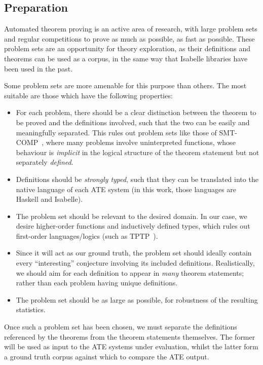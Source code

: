 \subsection{Preparation}
\label{section:prep}

Automated theorem proving is an active area of research, with large problem sets
and regular competitions to prove as much as possible, as fast as
possible\cite{pelletier2002development}. These problem sets are an opportunity
for theory exploration, as their definitions and theorems can be used as a
corpus, in the same way that Isabelle libraries have been used in the past.

Some problem sets are more amenable for this purpose than others. The most
suitable are those which have the following properties:

\begin{itemize}
\item For each problem, there should be a clear distinction between the theorem
  to be proved and the definitions involved, such that the two can be easily and
  meaningfully separated. This rules out problem sets like those of
  SMT-COMP~\cite{barrett2005smt}, where many problems involve uninterpreted
  functions, whose behaviour is \emph{implicit} in the logical structure of the
  theorem statement but not separately \emph{defined}.
\item Definitions should be \emph{strongly typed}, such that they can be
  translated into the native language of each ATE system (in this work, those
  languages are Haskell and Isabelle).
\item The problem set should be relevant to the desired domain. In our case, we
  desire higher-order functions and inductively defined types, which rules out
  first-order languages/logics (such as TPTP~\cite{sutcliffe2009tptp}).
\item Since it will act as our ground truth, the problem set should ideally
  contain every ``interesting'' conjecture involving its included
  definitions. Realistically, we should aim for each definition to appear in
  \emph{many} theorem statements; rather than each problem having unique
  definitions.
\item The problem set should be as large as possible, for robustness of the
  resulting statistics.
\end{itemize}

Once such a problem set has been chosen, we must separate the definitions
referenced by the theorems from the theorem statements themselves. The former
will be used as input to the ATE systems under evaluation, whilst the latter
form a ground truth corpus against which to compare the ATE output.

